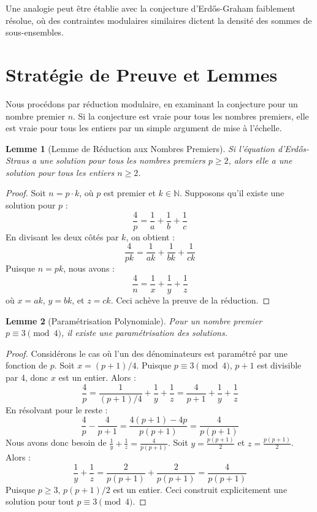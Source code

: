 \documentclass[12pt,a4paper]{article}
\newtheorem{lemma}{Lemme}
\begin{document}
Une analogie peut \^etre \'etablie avec la conjecture d'Erd\H{o}s-Graham faiblement r\'esolue, o\`u des contraintes modulaires similaires dictent la densit\'e des sommes de sous-ensembles.

\section{Strat\'egie de Preuve et Lemmes}

Nous proc\'edons par r\'eduction modulaire, en examinant la conjecture pour un nombre premier $n$. Si la conjecture est vraie pour tous les nombres premiers, elle est vraie pour tous les entiers par un simple argument de mise \`a l'\'echelle.

\begin{lemma}[Lemme de R\'eduction aux Nombres Premiers]
Si l'\'equation d'Erd\H{o}s-Straus a une solution pour tous les nombres premiers $p \geq 2$, alors elle a une solution pour tous les entiers $n \geq 2$.
\end{lemma}
\begin{proof}
Soit $n = p \cdot k$, o\`u $p$ est premier et $k \in \mathbb{N}$. Supposons qu'il existe une solution pour $p$ :
$$ \frac{4}{p} = \frac{1}{a} + \frac{1}{b} + \frac{1}{c} $$
En divisant les deux c\^ot\'es par $k$, on obtient :
$$ \frac{4}{pk} = \frac{1}{ak} + \frac{1}{bk} + \frac{1}{ck} $$
Puisque $n = pk$, nous avons :
$$ \frac{4}{n} = \frac{1}{x} + \frac{1}{y} + \frac{1}{z} $$
o\`u $x=ak$, $y=bk$, et $z=ck$. Ceci ach\`eve la preuve de la r\'eduction.
\end{proof}

\begin{lemma}[Param\'etrisation Polynomiale]
Pour un nombre premier $p \equiv 3 \pmod 4$, il existe une param\'etrisation des solutions.
\end{lemma}
\begin{proof}
Consid\'erons le cas o\`u l'un des d\'enominateurs est param\'etr\'e par une fonction de $p$. Soit $x = (p+1)/4$. Puisque $p \equiv 3 \pmod 4$, $p+1$ est divisible par 4, donc $x$ est un entier. Alors :
$$ \frac{4}{p} = \frac{1}{(p+1)/4} + \frac{1}{y} + \frac{1}{z} = \frac{4}{p+1} + \frac{1}{y} + \frac{1}{z} $$
En r\'esolvant pour le reste :
$$ \frac{4}{p} - \frac{4}{p+1} = \frac{4(p+1) - 4p}{p(p+1)} = \frac{4}{p(p+1)} $$
Nous avons donc besoin de $\frac{1}{y} + \frac{1}{z} = \frac{4}{p(p+1)}$.
Soit $y = \frac{p(p+1)}{2}$ et $z = \frac{p(p+1)}{2}$. Alors :
$$ \frac{1}{y} + \frac{1}{z} = \frac{2}{p(p+1)} + \frac{2}{p(p+1)} = \frac{4}{p(p+1)} $$
Puisque $p \geq 3$, $p(p+1)/2$ est un entier. Ceci construit explicitement une solution pour tout $p \equiv 3 \pmod 4$.
\end{proof}
\end{document}
